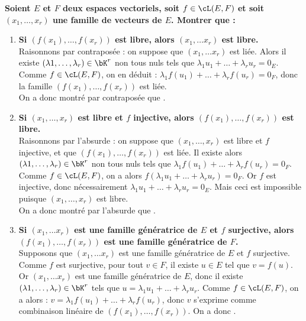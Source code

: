 \documentclass[a4paper, 11pt,reqno]{article}
\begin{document}
\begin{correction}  \;
	\textbf{Soient $E$ et $F$ deux espaces vectoriels, soit $f\in\cL(E,F)$ et soit $(x_1,\dots, x_r)$ une famille de vecteurs de $E$. Montrer que :}
	\begin{enumerate}
		\item \textbf{Si $\left( f(x_1),\dots, f(x_r)   \right)$ est libre, alors $(x_1,\dots x_r)$ est libre.}\\
		      Raisonnons par contrapos\'ee : on suppose que  $(x_1,\dots x_r)$ est li\'ee. Alors il existe $(\lambda1, \ldots, \lambda_r) \in \bK^r$ non tous nuls tels que $\lambda_1 u_1+ \ldots +\lambda_r u_r = 0_E$. Comme $f \in \cL(E,F)$, on en d\'eduit : $\lambda_1 f(u_1) + \ldots + \lambda_r f(u_r) = 0_F$, donc la famille $\left( f(x_1),\dots, f(x_r)   \right)$ est li\'ee.\\
		      On a donc montr\'e par contrapos\'ee que .
		\item \textbf{Si $(x_1,\dots, x_r)$ est libre et $f$ injective, alors $\left( f(x_1),\dots, f(x_r)      \right)$ est libre.}\\
		      Raisonnons par l'absurde : on suppose que $(x_1,\dots, x_r)$ est libre et $f$ injective, et que $\left( f(x_1),\dots, f(x_r)      \right)$ est li\'ee. Il existe alors $(\lambda1, \ldots, \lambda_r) \in \bK^r$ non tous nuls tels que $\lambda_1 f(u_1) + \ldots + \lambda_r f(u_r) = 0_F$. Comme $f \in \cL(E,F)$, on a alors $f( \lambda_1 u_1+ \ldots +\lambda_r u_r) = 0_F$. Or $f$ est injective, donc n\'ecessairement $\lambda_1 u_1+ \ldots +\lambda_r u_r = 0_E$. Mais ceci est impossible puisque $(x_1,\dots, x_r)$ est libre.\\
		      On a donc montr\'e par l'absurde que .
		\item \textbf{Si $(x_1,\dots x_r)$ est une famille g\'en\'eratrice de $E$ et $f$ surjective, alors $\left( f(x_1),\dots, f(x_r)   \right)$ est une famille g\'en\'eratrice de $F$.}\\
		      Supposons que $(x_1,\dots x_r)$ est une famille g\'en\'eratrice de $E$ et $f$ surjective. Comme $f$ est surjective, pour tout $v\in F$, il existe $u \in E$ tel que $v=f(u)$. Or  $(x_1,\dots x_r)$ est une  famille g\'en\'eratrice de $E$, donc  il existe $(\lambda1, \ldots, \lambda_r) \in \bK^r$ tels que $u= \lambda_1 u_1+ \ldots +\lambda_r u_r $. Comme $f \in \cL(E,F)$, on a alors : $v=\lambda_1 f(u_1) + \ldots + \lambda_r f(u_r)$, donc $v$ s'exprime comme combinaison lin\'eaire de $\left( f(x_1),\dots, f(x_r)   \right)$. On a donc .

\end{enumerate}
\end{correction}
\end{document}

